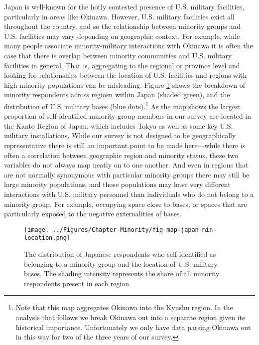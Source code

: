 Japan is well-known for the hotly contested presence of U.S. military facilities, particularly in areas like Okinawa. However, U.S. military facilities exist all throughout the country, and so the relationship between minority groups and U.S. facilities may vary depending on geographic context. For example, while many people associate minority-military interactions with Okinawa it is often the case that there is overlap between minority communities and U.S. military facilities in general. That is, aggregating to the regional or province level and looking for relationships between the location of U.S. facilities and regions with high minority populations can be misleading. Figure \ref{fig:japanminoritymap} shows the breakdown of minority respondents across regiosn within Japan (shaded green), and the distribution of U.S. military bases (blue dots).\footnote{Note that this map aggregates Okinawa into the Kyushu region. In the analysis that follows we break Okinawa out into a separate region given its historical importance. Unfortunately we only have data parsing Okinawa out in this way for two of the three years of our survey.} As the map shows the largest proportion of self-identified minority group members in our survey are located in the Kanto Region of Japan, which includes Tokyo as well as some key U.S. military installations. While our survey is not designed to be geographically representative there is still an important point to be made here---while there is often a correlation between geographic region and minority status, these two variables do not always map neatly on to one another. And even in regions that are not normally synonymous with particular minority groups there may still be large minority populations, and those populations may have very different interactions with U.S. military personnel than individuals who do not belong to a minority group. For example, occupying space close to bases, or spaces that are particularly exposed to the negative externalities of bases.


\begin{figure}[t]
	\centering\texttt{[image: ../Figures/Chapter-Minority/fig-map-japan-min-location.png]}
	\caption{The distribution of Japanese respondents who self-identified as belonging to a minority group and the location of U.S. military bases. The shading intensity represents the share of all minority respondents present in each region.}
	\label{fig:japanminoritymap}
\end{figure}


